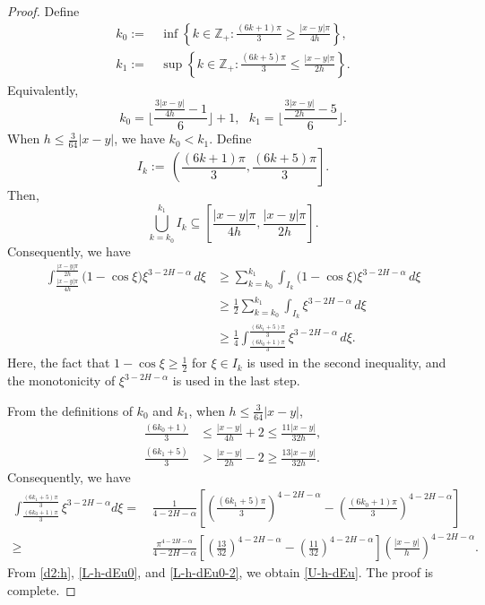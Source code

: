 \documentclass[11pt,reqno]{amsart}
\numberwithin{equation}{section}
\newcommand{\1}{{\bf 1}}
\newcommand{\2}{{\bf 2}}
\newcommand{\lt}{\left }
\newcommand{\rt}{\right}
\begin{document}
\begin{proof}
Define
\begin{align*}
   k_0:= &\, \inf \left\{k\in\mathbb Z_+:\frac{(6k+1)\pi}{3}\geq \frac{|x-y|\pi}{4h}\rt\},\\
      k_1:=&\, \sup\lt\{k\in\mathbb Z_+:\frac{(6k+5)\pi}{3}\leq \frac{|x-y|\pi}{2h}\rt\}.
  \end{align*}
  Equivalently,
$$
k_0=\Bigg\lfloor\frac{\frac{3|x-y|}{4h}-1}{6}\Bigg\rfloor+1,\ \ \
k_1=\Bigg\lfloor\frac{\frac{3|x-y|}{2h}-5}{6}\Bigg\rfloor.
$$
When $h\leq\frac3{64}|x-y|$,   we have  $k_0< k_1$. Define  
   $$I_k:= \, \left(\frac{(6k+1)\pi}{3},\frac{(6k+5)\pi}{3}\right].$$
 Then,
$$
\bigcup_{k=k_0}^{k_1}I_k\subseteq\left[\frac{|x-y|\pi}{4h},\frac{|x-y|\pi}{2h}\right].
$$
 Consequently,  we have
\begin{equation}\label{L-h-dEu0}
\begin{split}
\int_{\frac{|x-y|\pi}{4h}}^{\frac{|x-y|\pi}{2h}} \bigl(1-\cos\xi\bigr)  \xi^{3-2H-\alpha} \,d\xi
&\geq \sum_{k=k_0}^{k_1} \int_{I_k} \bigl(1-\cos\xi\bigr) \xi^{3-2H-\alpha} \,d\xi \\
&\geq \frac{1}{2}\sum_{k=k_0}^{k_1} \int_{I_k} \xi^{3-2H-\alpha} \,d\xi \\
&\geq \frac{1}{4} \int_{\frac{(6k_0+1)\pi}{3}}^{\frac{(6k_1+5)\pi}{3}} \xi^{3-2H-\alpha} \,d\xi.
\end{split}
\end{equation}
Here,   the  fact that $1 - \cos\xi \geq \frac{1}{2}$  for  $\xi\in I_k$  is used in the second inequality,
  and    the monotonicity of $\xi^{3-2H-\alpha}$ is used in the last step.

 From the definitions of $k_0$ and $k_1$,   when $h \leq \frac{3}{64}|x-y|$,
\begin{align*}
\frac{(6k_0+1)}{3} &\leq \frac{|x-y|}{4h} + 2 \leq \frac{11|x-y|}{32h},\\
\frac{(6k_1+5)}{3} &> \frac{|x-y|}{2h} - 2 \geq \frac{13|x-y|}{32h}. 
\end{align*}
Consequently, we have
\begin{equation}\label{L-h-dEu0-2}
\begin{split}
 \int_{\frac{(6k_0+1)\pi}{3}}^{\frac{(6k_1+5)\pi}{3}} \xi^{3-2H-\alpha}  d\xi 
= &\,  \frac{1}{4-2H-\alpha} \left[ \left(\frac{(6k_1+5)\pi}{3}\right)^{4-2H-\alpha} - \left(\frac{(6k_0+1)\pi}{3}\right)^{4-2H-\alpha} \right] \\
 \geq &\,  \frac{\pi^{4-2H-\alpha}}{4-2H-\alpha} \left[ \left(\frac{13}{32}\right)^{4-2H-\alpha} - \left(\frac{11}{32}\right)^{4-2H-\alpha} \right] \left(\frac{|x-y|}{h}\right)^{4-2H-\alpha}.
\end{split}
\end{equation}
From \eqref{d2:h}, \eqref{L-h-dEu0}, and \eqref{L-h-dEu0-2}, we obtain \eqref{U-h-dEu}. The proof is complete.
\end{proof}
\end{document}
